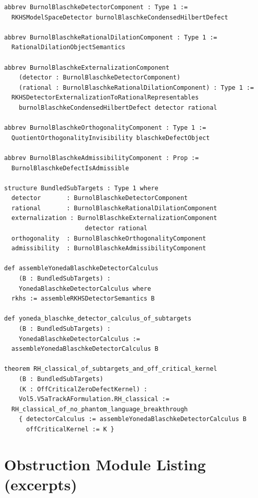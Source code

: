 \documentclass[12pt]{article}
\theoremstyle{plain}
\theoremstyle{definition}
\theoremstyle{remark}
\begin{document}
\begin{verbatim}
abbrev BurnolBlaschkeDetectorComponent : Type 1 :=
  RKHSModelSpaceDetector burnolBlaschkeCondensedHilbertDefect

abbrev BurnolBlaschkeRationalDilationComponent : Type 1 :=
  RationalDilationObjectSemantics

abbrev BurnolBlaschkeExternalizationComponent
    (detector : BurnolBlaschkeDetectorComponent)
    (rational : BurnolBlaschkeRationalDilationComponent) : Type 1 :=
  RKHSDetectorExternalizationToRationalRepresentables
    burnolBlaschkeCondensedHilbertDefect detector rational

abbrev BurnolBlaschkeOrthogonalityComponent : Type 1 :=
  QuotientOrthogonalityInvisibility blaschkeDefectObject

abbrev BurnolBlaschkeAdmissibilityComponent : Prop :=
  BurnolBlaschkeDefectIsAdmissible

structure BundledSubTargets : Type 1 where
  detector       : BurnolBlaschkeDetectorComponent
  rational       : BurnolBlaschkeRationalDilationComponent
  externalization : BurnolBlaschkeExternalizationComponent
                      detector rational
  orthogonality  : BurnolBlaschkeOrthogonalityComponent
  admissibility  : BurnolBlaschkeAdmissibilityComponent

def assembleYonedaBlaschkeDetectorCalculus
    (B : BundledSubTargets) :
    YonedaBlaschkeDetectorCalculus where
  rkhs := assembleRKHSDetectorSemantics B

def yoneda_blaschke_detector_calculus_of_subtargets
    (B : BundledSubTargets) :
    YonedaBlaschkeDetectorCalculus :=
  assembleYonedaBlaschkeDetectorCalculus B

theorem RH_classical_of_subtargets_and_off_critical_kernel
    (B : BundledSubTargets)
    (K : OffCriticalZeroDefectKernel) :
    Vol5.V5aTrackAFormulation.RH_classical :=
  RH_classical_of_no_phantom_language_breakthrough
    { detectorCalculus := assembleYonedaBlaschkeDetectorCalculus B
      offCriticalKernel := K }
\end{verbatim}

\section{Obstruction Module Listing (excerpts)}
\label{app:obstruction-listing}
\end{document}
